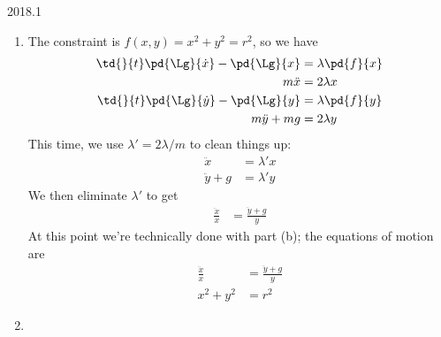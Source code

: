 \documentclass[12pt]{article}
\begin{document}
\begin{solution}{2018.1}
\begin{enumerate}
\item
The constraint is $f(x,y) = x^2 + y^2 = r^2$, so we have
\begin{align*}
\td{}{t} \pd{\Lg}{\dot{x}} - \pd{\Lg}{x} & = \lambda \pd{f}{x} \\
m \ddot{x} & = 2\lambda x \\
\td{}{t} \pd{\Lg}{\dot{y}} - \pd{\Lg}{y} & = \lambda \pd{f}{y} \\
m \ddot{y} + mg & = 2\lambda y \\
\end{align*}
This time, we use $\lambda' = 2\lambda/m$ to clean things up:
\begin{align*}
\ddot{x} & = \lambda' x \\
\ddot{y} + g & = \lambda' y
\end{align*}
We then eliminate $\lambda'$ to get
\begin{align*}
\frac{\ddot{x}}{x} & = \frac{\ddot{y} + g}{y}
\end{align*}
At this point we're technically done with part (b); the equations of motion are
\begin{align*}
\frac{\ddot{x}}{x} & = \frac{\ddot{y} + g}{y} \\
x^2 + y^2 & = r^2
\end{align*}


\item



\end{enumerate}


% 
% 
% 
% 


\end{solution}
\end{document}
